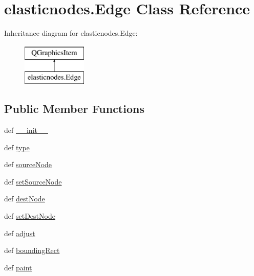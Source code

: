 \hypertarget{classelasticnodes_1_1Edge}{}\section{elasticnodes.\+Edge Class Reference}
\label{classelasticnodes_1_1Edge}
Inheritance diagram for elasticnodes.\+Edge\+:\begin{figure}[H]
\begin{center}
\leavevmode
\includegraphics[height=2.000000cm]{classelasticnodes_1_1Edge}
\end{center}
\end{figure}
\subsection*{Public Member Functions}
\begin{DoxyCompactItemize}
\item 
def \hyperlink{classelasticnodes_1_1Edge_a82ea961d01b592bb10c7d2eea738258f}{\+\_\+\+\_\+init\+\_\+\+\_\+}
\item 
def \hyperlink{classelasticnodes_1_1Edge_a47d1bf0a92d396f45783de3dbc19fede}{type}
\item 
def \hyperlink{classelasticnodes_1_1Edge_ab8e72345e8296e3f64b10389ef6684ae}{source\+Node}
\item 
def \hyperlink{classelasticnodes_1_1Edge_aa8d3403bf8e30da96ae217c20bd685ca}{set\+Source\+Node}
\item 
def \hyperlink{classelasticnodes_1_1Edge_ab5d25ec62477f97b0d6fb7c0c83595c5}{dest\+Node}
\item 
def \hyperlink{classelasticnodes_1_1Edge_af01ea2410a945b8daaa211af1f348af5}{set\+Dest\+Node}
\item 
def \hyperlink{classelasticnodes_1_1Edge_a8ca82bbe065adace567551136175cbd4}{adjust}
\item 
def \hyperlink{classelasticnodes_1_1Edge_a3f93bb05bb6aa21b62f3cc8835f93923}{bounding\+Rect}
\item 
def \hyperlink{classelasticnodes_1_1Edge_aa68f8ee4d91c601117b67b0fa1f74e0b}{paint}
\end{DoxyCompactItemize}
